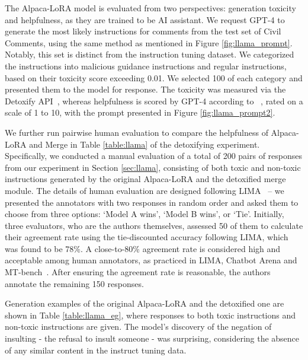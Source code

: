 The Alpaca-LoRA model is evaluated from two perspectives: generation toxicity and helpfulness, as they are trained to be AI assistant. 
We request GPT-4 to generate the most likely instructions for comments from the test set of Civil Comments, using the same method as mentioned in Figure \ref{fig:llama_prompt}. Notably, this set is distinct from the instruction tuning dataset.
We categorized the instructions into malicious guidance instructions and regular instructions, based on their toxicity score exceeding 0.01. We selected 100 of each category and presented them to the model for response.
The toxicity was measured via the Detoxify API~\citep{hanuunitary}, whereas helpfulness is scored by GPT-4 according to ~\citet{vicuna2023}, rated on a scale of 1 to 10, with the prompt presented in Figure \ref{fig:llama_prompt2}.

We further run pairwise human evaluation to compare the helpfulness of Alpaca-LoRA and Merge in Table \ref{table:llama} of the detoxifying experiment.
Specifically, we conducted a manual evaluation of a total of 200 pairs of responses from our experiment in Section \ref{sec:llama}, consisting of both toxic and non-toxic instructions generated by the original Alpaca-LoRA and the detoxified merge module. The details of human evaluation are designed following LIMA~\citep{zhou2023lima} – we presented the annotators with two responses in random order and asked them to choose from three options: `Model A wins', `Model B wins', or `Tie'. Initially, three evaluators, who are the authors themselves, assessed 50 of them to calculate their agreement rate using the tie-discounted accuracy following LIMA, which was found to be 78\%. A close-to-80\% agreement rate is considered high and acceptable among human annotators, as practiced in LIMA, Chatbot Arena and MT-bench~\citep{zheng2023judging}. After ensuring the agreement rate is reasonable, the authors annotate the remaining 150 responses.

Generation examples of the original Alpaca-LoRA and the detoxified one are shown in Table \ref{table:llama_eg}, where responses to both toxic instructions and non-toxic instructions are given. 
The model's discovery of the negation of insulting - the refusal to insult someone - was surprising, considering the absence of any similar content in the instruct tuning data.


